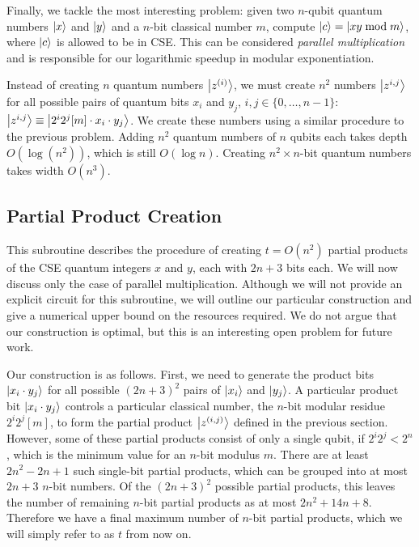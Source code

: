 \documentclass[twoside]{article}
\begin{document}
Finally, we tackle the most interesting problem:
given two $n$-qubit quantum numbers $\left\vert{x}\right\rangle$ and
$\left\vert{y}\right\rangle$ and a $n$-bit classical number
$m$,
compute $\left\vert{c}\right\rangle = \left\vert{xy \bmod m}\right\rangle$,
where $\left\vert{c}\right\rangle$ is allowed to be in CSE.
This can be considered \emph{parallel multiplication} and is responsible
for our logarithmic speedup in modular exponentiation.

Instead of creating $n$ quantum numbers $\left\vert{z^{(i)}}\right\rangle$, we must create
$n^2$ numbers
$\left\vert{z^{i,j}}\right\rangle$ for all possible pairs of quantum bits $x_i$ and $y_j$,
$i,j \in \{0,\ldots,n-1\}$:
$\left\vert{z^{i,j}}\right\rangle \equiv \left\vert{2^i2^j[m]\cdot x_i \cdot y_j}\right\rangle$.
We create these numbers using a similar procedure to the previous problem.
Adding $n^2$ quantum numbers of $n$ qubits each takes depth
$O(\log(n^2))$, which is still $O(\log n)$.
Creating $n^2\times n$-bit quantum numbers takes width $O(n^3)$.

\subsection{Partial Product Creation}
\label{subsec:ppc}

This subroutine describes the procedure of creating $t=O(n^2)$ partial products of
the CSE quantum integers $x$ and $y$, each with $2n+3$ bits each. We will now
discuss only the case of parallel multiplication. Although we
will not provide an explicit circuit for this subroutine, we will outline
our particular construction and give a numerical upper bound on the
resources required. We do not argue that our construction is optimal, but
this is an interesting open problem for future work.

Our construction is as follows. First, we need to generate the product bits
$\left\vert{x_i\cdot y_j}\right\rangle$ for all possible $(2n+3)^2$ pairs of $\left\vert{x_i}\right\rangle$ and
$\left\vert{y_j}\right\rangle$.
A particular product bit $\left\vert{x_i \cdot y_j}\right\rangle$
controls a particular classical number, the
$n$-bit modular residue $2^i 2^j [m]$, to form the partial product
$\left\vert{z^{(i,j)}}\right\rangle$ defined
in the previous section. However, some of these partial products
consist of only a single qubit, if $2^i 2^j < 2^n$, which is the minimum
value for an $n$-bit modulus $m$. There are at least $2n^2 - 2n + 1$
such single-bit partial products, which can be grouped into at most
$2n+3$ $n$-bit numbers. Of the $(2n+3)^2$ possible partial products,
this leaves the number of remaining $n$-bit partial products as at most
$2n^2 + 14n +8$. Therefore we have a final maximum number of $n$-bit
partial products, which we will simply refer to as $t$ from now on.
\end{document}
